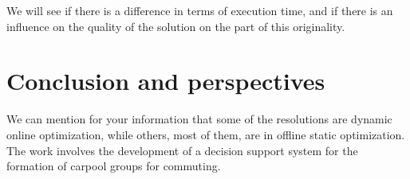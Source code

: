 \documentclass[12pt, a4paper,twoside]{memoir}
\begin{document}
	We will see if there is a difference in terms of execution time, and if there is an influence on the quality of the solution on the part of this originality.

	\cleardoublepage
	\chapter*{Conclusion and perspectives}
	
	We can mention for your information that some of the resolutions are dynamic online optimization, while others, most of them, are in offline static optimization.
	The work involves the development of a decision support system for the formation of carpool groups for commuting.
	
	\backmatter
	\cleardoublepage
	
	
	
	
	\cleardoublepage
	\appendix
\end{document}
